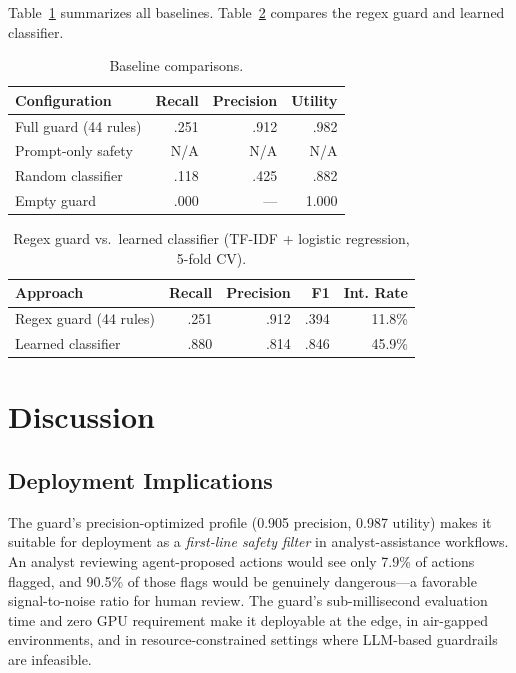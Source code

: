 \documentclass[journal]{IEEEtran}
\begin{document}
Table~\ref{tab:baselines} summarizes all baselines. Table~\ref{tab:learned} compares the regex guard and learned classifier.

\begin{table}[t]
\centering
\caption{Baseline comparisons.}
\label{tab:baselines}
\begin{tabular}{lrrr}
\toprule
Configuration & Recall & Precision & Utility \\
\midrule
Full guard (44 rules) & .251 & .912 & .982 \\
Prompt-only safety & N/A & N/A & N/A \\
Random classifier & .118 & .425 & .882 \\
Empty guard & .000 & --- & 1.000 \\
\bottomrule
\end{tabular}
\end{table}

\begin{table}[t]
\centering
\caption{Regex guard vs.\ learned classifier (TF-IDF + logistic regression, 5-fold CV).}
\label{tab:learned}
\begin{tabular}{lrrrr}
\toprule
Approach & Recall & Precision & F1 & Int. Rate \\
\midrule
Regex guard (44 rules) & .251 & .912 & .394 & 11.8\% \\
Learned classifier & .880 & .814 & .846 & 45.9\% \\
\bottomrule
\end{tabular}
\end{table}

\section{Discussion}
\label{sec:discussion}

\subsection{Deployment Implications}

The guard's precision-optimized profile (0.905 precision, 0.987 utility) makes it suitable for deployment as a \emph{first-line safety filter} in analyst-assistance workflows. An analyst reviewing agent-proposed actions would see only 7.9\% of actions flagged, and 90.5\% of those flags would be genuinely dangerous---a favorable signal-to-noise ratio for human review. The guard's sub-millisecond evaluation time and zero GPU requirement make it deployable at the edge, in air-gapped environments, and in resource-constrained settings where LLM-based guardrails are infeasible.
\end{document}

